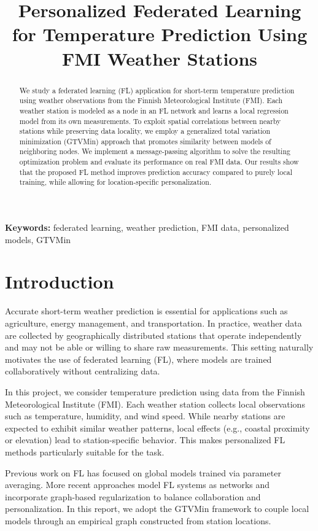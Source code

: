 \documentclass[9pt]{article}
\title{Personalized Federated Learning for Temperature Prediction Using FMI Weather Stations}
\begin{document}
	\maketitle
	
	\begin{abstract}
		We study a federated learning (FL) application for short-term temperature prediction
		using weather observations from the Finnish Meteorological Institute (FMI).
		Each weather station is modeled as a node in an FL network and learns a local regression
		model from its own measurements.
		To exploit spatial correlations between nearby stations while preserving data locality,
		we employ a generalized total variation minimization (GTVMin) approach that promotes
		similarity between models of neighboring nodes.
		We implement a message-passing algorithm to solve the resulting optimization problem
		and evaluate its performance on real FMI data.
		Our results show that the proposed FL method improves prediction accuracy compared
		to purely local training, while allowing for location-specific personalization.
	\end{abstract}
	
	\textbf{Keywords:} federated learning, weather prediction, FMI data, personalized models, GTVMin
	
	\section{Introduction}
	\label{sec:intro}
	
	Accurate short-term weather prediction is essential for applications such as agriculture,
	energy management, and transportation.
	In practice, weather data are collected by geographically distributed stations that operate
	independently and may not be able or willing to share raw measurements.
	This setting naturally motivates the use of federated learning (FL), where models are trained
	collaboratively without centralizing data.
	
	In this project, we consider temperature prediction using data from the Finnish Meteorological
	Institute (FMI).
	Each weather station collects local observations such as temperature, humidity, and wind speed.
	While nearby stations are expected to exhibit similar weather patterns, local effects
	(e.g., coastal proximity or elevation) lead to station-specific behavior.
	This makes personalized FL methods particularly suitable for the task.
	
	Previous work on FL has focused on global models trained via parameter averaging.
	More recent approaches model FL systems as networks and incorporate graph-based regularization
	to balance collaboration and personalization.
	In this report, we adopt the GTVMin framework to couple local models through an empirical graph
	constructed from station locations.
	
\end{document}

